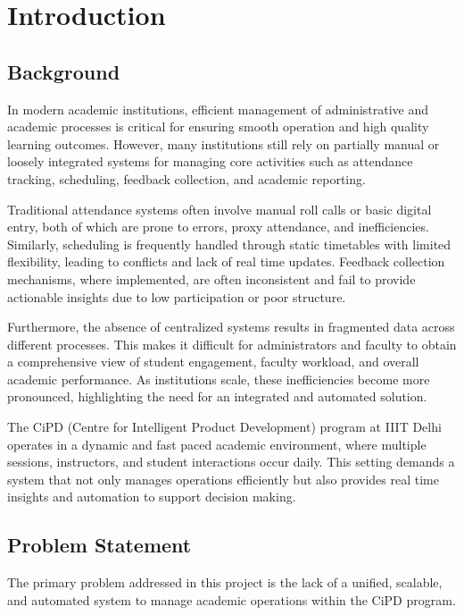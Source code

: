 
\chapter{Introduction}{\label{ch:intro}}

\section{Background}

In modern academic institutions, efficient management of administrative and academic processes is
critical for ensuring smooth operation and high quality learning outcomes. However, many
institutions still rely on partially manual or loosely integrated systems for managing core activities
such as attendance tracking, scheduling, feedback collection, and academic reporting.

Traditional attendance systems often involve manual roll calls or basic digital entry, both of which are
prone to errors, proxy attendance, and inefficiencies. Similarly, scheduling is frequently handled
through static timetables with limited flexibility, leading to conflicts and lack of real time updates.
Feedback collection mechanisms, where implemented, are often inconsistent and fail to provide
actionable insights due to low participation or poor structure.

Furthermore, the absence of centralized systems results in fragmented data across different
processes. This makes it difficult for administrators and faculty to obtain a comprehensive view of
student engagement, faculty workload, and overall academic performance. As institutions scale,
these inefficiencies become more pronounced, highlighting the need for an integrated and
automated solution.

The CiPD (Centre for Intelligent Product Development) program at IIIT Delhi operates in a dynamic
and fast paced academic environment, where multiple sessions, instructors, and student interactions
occur daily. This setting demands a system that not only manages operations efficiently but also
provides real time insights and automation to support decision making.

\section{Problem Statement}

The primary problem addressed in this project is the lack of a unified, scalable, and automated
system to manage academic operations within the CiPD program.

